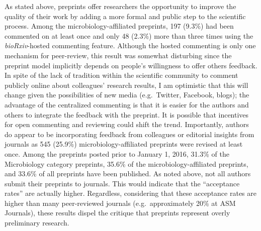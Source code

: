 \documentclass[11pt,]{article}
\begin{document}
As stated above, preprints offer researchers the opportunity to improve
the quality of their work by adding a more formal and public step to the
scientific process. Among the microbiology-affiliated preprints, 197
(9.3\%) had been commented on at least once and only 48 (2.3\%) more
than three times using the \emph{bioRxiv}-hosted commenting feature.
Although the hosted commenting is only one mechanism for peer-review,
this result was somewhat disturbing since the preprint model implicitly
depends on people's willingness to offer others feedback. In spite of
the lack of tradition within the scientific community to comment
publicly online about colleagues' research results, I am optimistic that
this will change given the possibilities of new media (e.g.~Twitter,
Facebook, blogs); the advantage of the centralized commenting is that it
is easier for the authors and others to integrate the feedback with the
preprint. It is possible that incentives for open commenting and
reviewing could shift the trend. Importantly, authors do appear to be
incorporating feedback from colleagues or editorial insights from
journals as 545 (25.9\%) microbiology-affiliated preprints were revised
at least once. Among the preprints posted prior to January 1, 2016,
31.3\% of the Microbiology category preprints, 35.6\% of the
microbiology-affiliated preprints, and 33.6\% of all preprints have been
published. As noted above, not all authors submit their preprints to
journals. This would indicate that the ``acceptance rates'' are actually
higher. Regardless, considering that these acceptance rates are higher
than many peer-reviewed journals (e.g.~approximately 20\% at ASM
Journals), these results dispel the critique that preprints represent
overly preliminary research.
\end{document}
